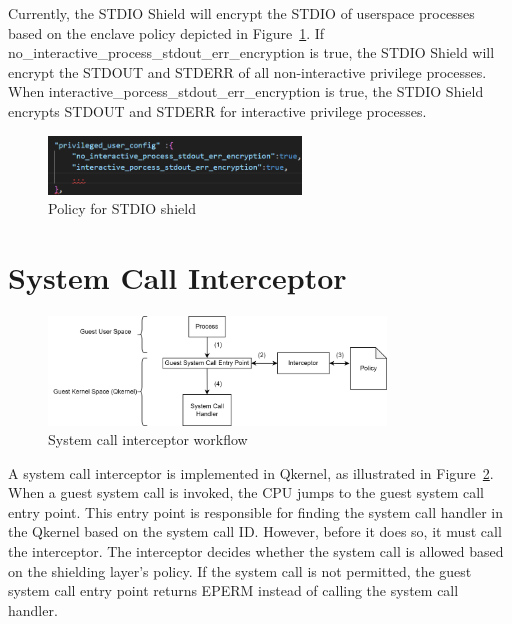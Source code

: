 Currently, the STDIO Shield will encrypt the STDIO of userspace processes based on the enclave policy depicted in Figure~\ref{fig:stdio_policy}. If no\_interactive\_process\_stdout\_err\_encryption is true, the STDIO Shield will encrypt the STDOUT and STDERR of all 
non-interactive privilege processes. When interactive\_porcess\_stdout\_err\_encryption is true, the STDIO Shield encrypts STDOUT and STDERR for interactive privilege processes.

\begin{figure}[!htb]
    \centering
    \includegraphics[width=0.6\textwidth]{images/stdio_policy.png}
    \caption[Policy for STDIO shield]{Policy for STDIO shield}
    \label{fig:stdio_policy}
\end{figure}


\section{System Call Interceptor}
\label{sec:design_Interceptor}
\begin{figure}[!htb]
    \centering
    \includegraphics[width=0.8\textwidth]{images/syscall_interceptor.png}
    \caption[System call interceptor workflow]{System call interceptor workflow}
    \label{fig:syscall_interceptor}
\end{figure}
A system call interceptor is implemented in Qkernel, as illustrated in Figure~\ref{fig:syscall_interceptor}. When a guest system call is invoked, the CPU jumps to the guest system call entry point. This entry point is responsible for finding the system call handler in the Qkernel based on the system 
call ID. However, before it does so, it must call the interceptor. The interceptor decides whether the system call is allowed based on the shielding layer's policy. If the system call is not permitted, the guest system call entry point returns EPERM instead of calling the 
system call handler.

